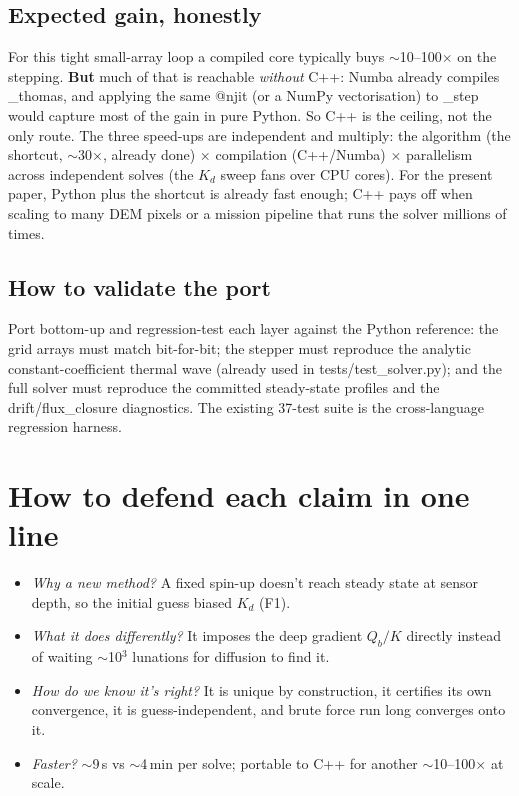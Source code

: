\documentclass[11pt]{article}
\newcommand{\code}[1]{{\ttfamily\small #1}}
\begin{document}
\subsection{Expected gain, honestly}
For this tight small-array loop a compiled core typically buys $\sim$10--100$\times$
on the stepping. \textbf{But} much of that is reachable \emph{without} C++:
Numba already compiles \code{\_thomas}, and applying the same \code{@njit} (or a
NumPy vectorisation) to \code{\_step} would capture most of the gain in pure
Python. So C++ is the ceiling, not the only route. The three speed-ups are
independent and multiply: the algorithm (the shortcut, $\sim$30$\times$, already
done) $\times$ compilation (C++/Numba) $\times$ parallelism across independent
solves (the $K_d$ sweep fans over CPU cores). For the present paper, Python plus
the shortcut is already fast enough; C++ pays off when scaling to many DEM pixels
or a mission pipeline that runs the solver millions of times.

\subsection{How to validate the port}
Port bottom-up and regression-test each layer against the Python reference: the
grid arrays must match bit-for-bit; the stepper must reproduce the analytic
constant-coefficient thermal wave (already used in \code{tests/test\_solver.py});
and the full solver must reproduce the committed steady-state profiles and the
\code{drift}/\code{flux\_closure} diagnostics. The existing 37-test suite is the
cross-language regression harness.

\section*{How to defend each claim in one line}
\begin{itemize}[leftmargin=1.4em,itemsep=2pt]
\item \emph{Why a new method?} A fixed spin-up doesn't reach steady state at
sensor depth, so the initial guess biased $K_d$ (F1).
\item \emph{What it does differently?} It imposes the deep gradient $Q_b/K$
directly instead of waiting $\sim$10$^3$ lunations for diffusion to find it.
\item \emph{How do we know it's right?} It is unique by construction, it
certifies its own convergence, it is guess-independent, and brute force run long
converges onto it.
\item \emph{Faster?} $\sim$9\,s vs $\sim$4\,min per solve; portable to C++ for
another $\sim$10--100$\times$ at scale.
\end{itemize}
\end{document}
